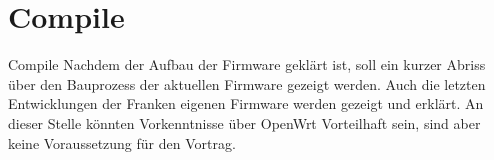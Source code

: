 \section{Compile}

\begin{frame}{Compile}
Nachdem der Aufbau der Firmware geklärt ist, soll ein kurzer Abriss
über den Bauprozess der aktuellen Firmware gezeigt werden. Auch die
letzten Entwicklungen der Franken eigenen Firmware werden gezeigt
und erklärt. An dieser Stelle könnten Vorkenntnisse über OpenWrt
Vorteilhaft sein, sind aber keine Voraussetzung für den Vortrag.
\end{frame}
